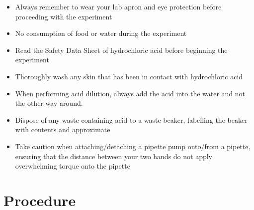 \documentclass[11pt, letterpaper]{article}
\begin{document}
\begin{itemize}
    \item Always remember to wear your lab apron and eye protection before proceeding with the experiment
    \item No consumption of food or water during the experiment
    \item Read the Safety Data Sheet of hydrochloric acid before beginning the experiment
    \item Thoroughly wash any skin that has been in contact with hydrochloric acid
    \item When performing acid dilution, always add the acid into the water and not the other way around.
    \item Dispose of any waste containing acid to a waste beaker, labelling the beaker with contents and approximate \ce{[H+]}
    \item Take caution when attaching/detaching a pipette pump onto/from a pipette, ensuring that the distance between your two hands do not apply overwhelming torque onto the pipette
\end{itemize}

\section{Procedure}
\end{document}
